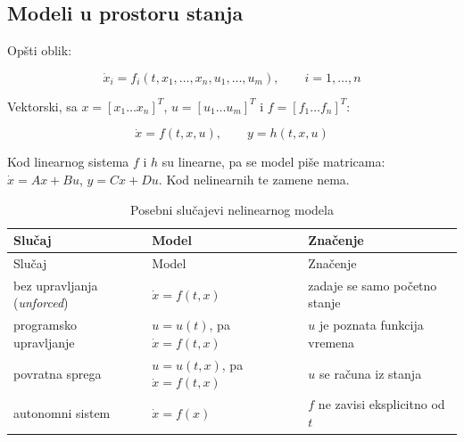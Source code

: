 \documentclass[11pt,a4paper,parskip=half,headsepline,numbers=noenddot]{scrartcl}
\begin{document}
\subsection{Modeli u prostoru stanja}

Opšti oblik:

\[\dot x_i = f_i(t, x_1, \dots, x_n, u_1, \dots, u_m), \qquad i = 1, \dots, n\]

Vektorski, sa \(x = [x_1 \dots x_n]^T\), \(u = [u_1 \dots u_m]^T\) i \(f = [f_1 \dots f_n]^T\):

\[\dot x = f(t, x, u), \qquad y = h(t, x, u)\]

Kod linearnog sistema \(f\) i \(h\) su linearne, pa se model piše matricama: \(\dot x = Ax + Bu\), \(y = Cx + Du\). Kod nelinearnih te zamene nema.

\begin{longtable}[]{@{}
  >{\raggedright\arraybackslash}p{}
  >{\raggedright\arraybackslash}p{}
  >{\raggedright\arraybackslash}p{}@{}}
\caption{Posebni slučajevi nelinearnog modela}\tabularnewline
\toprule\noalign{}
\begin{minipage}[b]{\linewidth}\raggedright
Slučaj
\end{minipage} & \begin{minipage}[b]{\linewidth}\raggedright
Model
\end{minipage} & \begin{minipage}[b]{\linewidth}\raggedright
Značenje
\end{minipage} \\
\midrule\noalign{}
\endfirsthead
\toprule\noalign{}
\begin{minipage}[b]{\linewidth}\raggedright
Slučaj
\end{minipage} & \begin{minipage}[b]{\linewidth}\raggedright
Model
\end{minipage} & \begin{minipage}[b]{\linewidth}\raggedright
Značenje
\end{minipage} \\
\midrule\noalign{}
\endhead
\bottomrule\noalign{}
\endlastfoot
bez upravljanja (\emph{unforced}) & \(\dot x = f(t, x)\) & zadaje se samo početno stanje \\
programsko upravljanje & \(u = u(t)\), pa \(\dot x = f(t, x)\) & \(u\) je poznata funkcija vremena \\
povratna sprega & \(u = u(t, x)\), pa \(\dot x = f(t, x)\) & \(u\) se računa iz stanja \\
autonomni sistem & \(\dot x = f(x)\) & \(f\) ne zavisi eksplicitno od \(t\) \\
\end{longtable}
\end{document}
